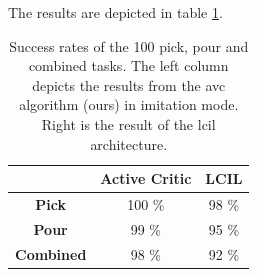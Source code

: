 The results are depicted in table \ref{tab:lcil}.

\begin{table}
    \centering
    \begin{tabular}{|c|c|c|}
        \cline{2-3}
        \multicolumn{1}{c|}{} & \textbf{Active Critic} & \textbf{LCIL} \\ \hline
        \textbf{Pick} & 100 \% & 98 \% \\ \hline
        \textbf{Pour} & 99 \% & 95 \% \\ \hline
        \textbf{Combined} & 98 \% & 92 \% \\ \hline
    \end{tabular}
    \caption{Success rates of the 100 pick, pour and combined tasks. The left column depicts the results from the \ac{avc} algorithm (ours) in 
    imitation mode. Right is the result of the \ac{lcil} architecture.}
    \label{tab:lcil}
\end{table}


